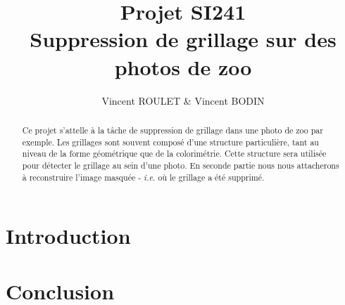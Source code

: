 \documentclass[10pt,a4paper]{article}
\title{Projet SI241 \\
Suppression de grillage sur des photos de zoo}
\author{Vincent ROULET \& Vincent BODIN}
\date{}
\begin{document}
\maketitle

\hrulefill
\vspace{2cm}
\renewcommand{\abstractname}{Résumé}
\begin{abstract}
Ce projet s'attelle à la tâche de suppression de grillage dans une photo de zoo par exemple. Les grillages sont souvent composé d'une structure particulière, tant au niveau de la forme géométrique que de la colorimétrie. Cette structure sera utilisée pour détecter le grillage au sein d'une photo. En seconde partie nous nous attacherons à reconstruire l'image masquée - \emph{i.e.} où le grillage a été supprimé. 
\end{abstract}

\newpage
\tableofcontents
\newpage

\section*{Introduction}










\section*{Conclusion}




\newpage



\end{document}
